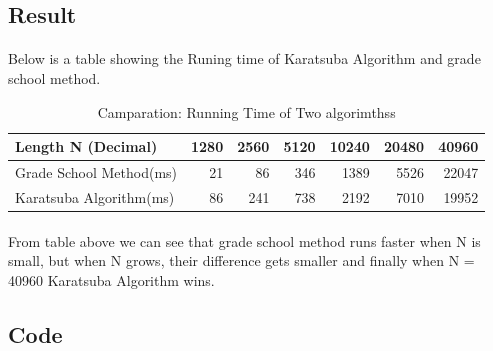 \documentclass[]{article}
\begin{document}
        \subsection*{Result}
            \paragraph{} Below is a table showing the Runing time of Karatsuba Algorithm and grade school method.
            \begin{table}[h!]
            \centering
            \caption{Camparation: Running Time of Two algorimthss}
            
            \begin{tabular}{l|*{6}{r}}
            \hline
                Length N (Decimal)           & 1280 &
                    2560 & 5120 & 10240 & 20480 & 40960 \\
            \hline
                Grade School Method(ms)   & 21   & 
                    86 &   346  & 1389 & 5526   & 22047  \\
                Karatsuba Algorithm(ms)   & 86   & 
                    241 &  738  & 2192 & 7010   & 19952 \\
            \hline            
            \end{tabular}
            \end{table}
            \paragraph{} From table above we can see that grade school method runs faster when N is small, but when N grows, their difference gets smaller and finally when N = 40960 Karatsuba Algorithm wins.
        \subsection*{Code}
        
\end{document}
